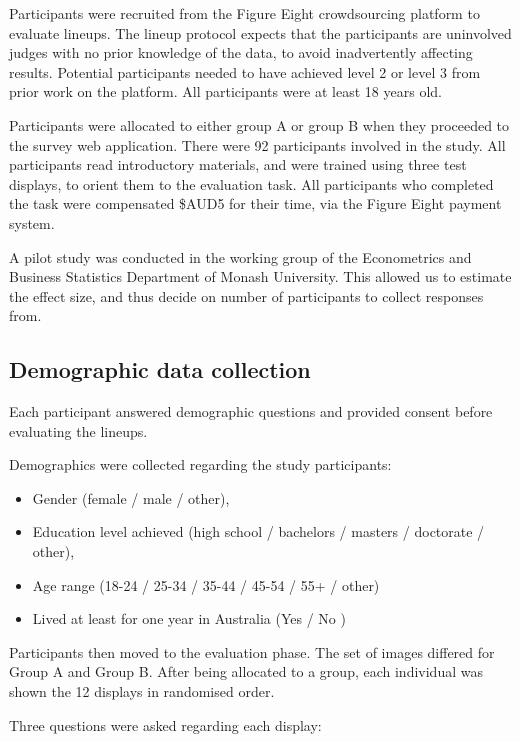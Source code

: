 \documentclass{monashthesis}
\begin{document}
Participants were recruited from the Figure Eight crowdsourcing platform \autocite{figeight} to evaluate lineups.
The lineup protocol expects that the participants are uninvolved judges with no prior knowledge of the data, to avoid inadvertently affecting results. Potential participants needed to have achieved level 2 or level 3 from prior work on the platform. All participants were at least 18 years old.

Participants were allocated to either group A or group B when they proceeded to the survey web application. There were 92 participants involved in the study. All participants read introductory materials, and were trained using three test displays, to orient them to the evaluation task. All participants who completed the task were compensated \$AUD5 for their time, via the Figure Eight payment system.

A pilot study was conducted in the working group of the Econometrics and Business Statistics Department of Monash University. This allowed us to estimate the effect size, and thus decide on number of participants to collect responses from.

\hypertarget{demographic-data-collection}{%
\subsection{Demographic data collection}\label{demographic-data-collection}}

Each participant answered demographic questions and provided consent before evaluating the lineups.

Demographics were collected regarding the study participants:

\begin{itemize}
\tightlist
\item
  Gender (female / male / other),
\item
  Education level achieved (high school / bachelors / masters / doctorate / other),
\item
  Age range (18-24 / 25-34 / 35-44 / 45-54 / 55+ / other)
\item
  Lived at least for one year in Australia (Yes / No )
\end{itemize}

Participants then moved to the evaluation phase.
The set of images differed for Group A and Group B.
After being allocated to a group, each individual was shown the 12 displays in randomised order.

Three questions were asked regarding each display:
\end{document}
